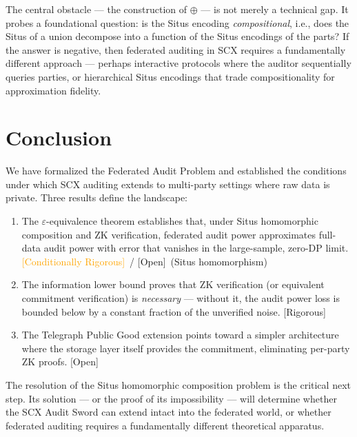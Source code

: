 \documentclass[12pt,a4paper]{article}
\newcommand{\rigorous}{\textcolor{green!50!black}{\small\textsf{[Rigorous]}}}
\newcommand{\conditionallyrigorous}{\textcolor{orange}{\small\textsf{[Conditionally Rigorous]}}}
\newcommand{\openquest}{\textcolor{red!70!black}{\small\textsf{[Open]}}}
\newcommand{\ZK}{\mathrm{ZK}}
\begin{document}
The central obstacle — the construction of $\oplus$ — is not merely a
technical gap.  It probes a foundational question: is the Situs encoding
\emph{compositional}, i.e., does the Situs of a union decompose into a
function of the Situs encodings of the parts?  If the answer is negative,
then federated auditing in SCX requires a fundamentally different approach
— perhaps interactive protocols where the auditor sequentially queries
parties, or hierarchical Situs encodings that trade compositionality for
approximation fidelity.

\section{Conclusion}

We have formalized the Federated Audit Problem and established the conditions
under which SCX auditing extends to multi-party settings where raw data is
private.  Three results define the landscape:

\begin{enumerate}[label=(\arabic*)]
    \item The $\varepsilon$-equivalence theorem establishes that, under Situs
          homomorphic composition and $\ZK$ verification, federated audit
          power approximates full-data audit power with error that vanishes
          in the large-sample, zero-DP limit.  \conditionallyrigorous~/
          \openquest~(Situs homomorphism)
    \item The information lower bound proves that $\ZK$ verification (or
          equivalent commitment verification) is \emph{necessary} — without
          it, the audit power loss is bounded below by a constant fraction
          of the unverified noise.  \rigorous
    \item The Telegraph Public Good extension points toward a simpler
          architecture where the storage layer itself provides the
          commitment, eliminating per-party $\ZK$ proofs.  \openquest
\end{enumerate}

The resolution of the Situs homomorphic composition problem is the critical
next step.  Its solution — or the proof of its impossibility — will determine
whether the SCX Audit Sword can extend intact into the federated world, or
whether federated auditing requires a fundamentally different theoretical
apparatus.
\end{document}
